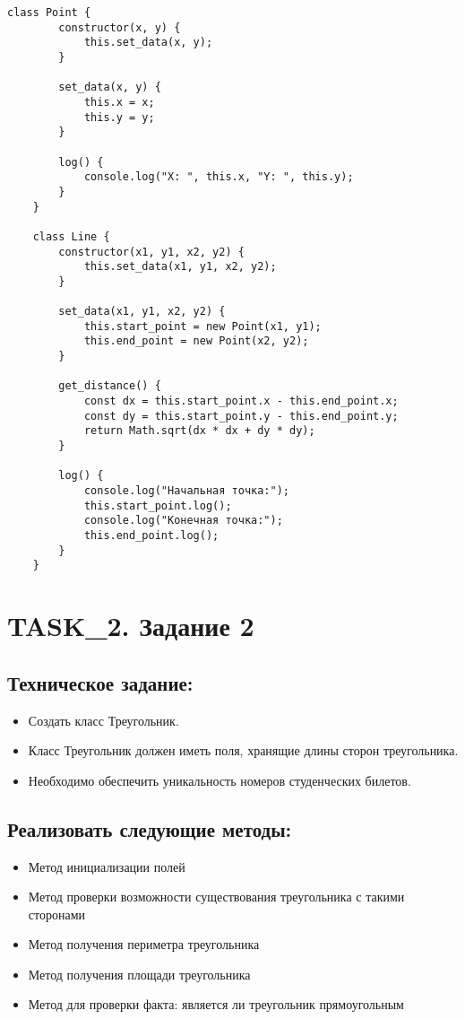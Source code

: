 \begin{lstlisting}[caption=Код программы. Задание 1.]
	class Point {
		constructor(x, y) {
			this.set_data(x, y);
		}
	
		set_data(x, y) {
			this.x = x;
			this.y = y;
		}
	
		log() {
			console.log("X: ", this.x, "Y: ", this.y);
		}
	}
	
	class Line {
		constructor(x1, y1, x2, y2) {
			this.set_data(x1, y1, x2, y2);
		}
	
		set_data(x1, y1, x2, y2) {
			this.start_point = new Point(x1, y1);
			this.end_point = new Point(x2, y2);
		}
	
		get_distance() {
			const dx = this.start_point.x - this.end_point.x;
			const dy = this.start_point.y - this.end_point.y;
			return Math.sqrt(dx * dx + dy * dy);
		}
	
		log() {
			console.log("Начальная точка:");
			this.start_point.log();
			console.log("Конечная точка:");
			this.end_point.log();
		}
	}	
\end{lstlisting}

\chapter{TASK\_2. Задание 2}

\section{Техническое задание:}

\begin{itemize}
	\item Создать класс Треугольник.
	\item Класс Треугольник должен иметь поля, хранящие длины сторон треугольника.
	\item Необходимо обеспечить уникальность номеров студенческих билетов.
\end{itemize}

\section{Реализовать следующие методы:}

\begin{itemize}
	\item Метод инициализации полей
	\item Метод проверки возможности существования треугольника с такими сторонами
	\item Метод получения периметра треугольника
	\item Метод получения площади треугольника
	\item Метод для проверки факта: является ли треугольник прямоугольным
\end{itemize}



